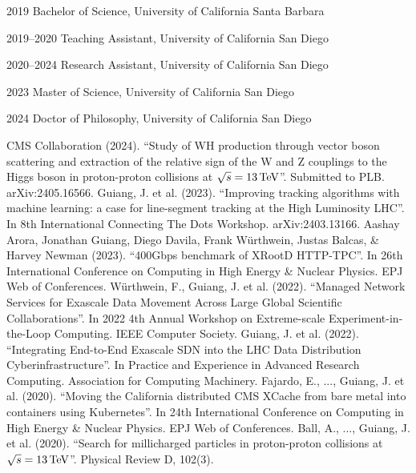 \begin{vita}
\noindent
\begin{cv}{}
\begin{cvlist}{}
\item[2019] Bachelor of Science, University of California Santa Barbara
\item[2019--2020] Teaching Assistant, University of California San Diego
\item[2020--2024] Research Assistant, University of California San Diego
\item[2023] Master of Science, University of California San Diego
\item[2024] Doctor of Philosophy, University of California San Diego
\end{cvlist}
\end{cv}

\publications
\noindent CMS Collaboration (2024). 
``Study of WH production through vector boson scattering and extraction of the relative sign of the W and Z couplings to the Higgs boson in proton-proton collisions at $\sqrt{s} = 13\,\text{Te\hspace{-.08em}V}$''. 
Submitted to PLB. arXiv:2405.16566.
\newline
\newline
\noindent Guiang, J. et al. (2023). 
``Improving tracking algorithms with machine learning: a case for line-segment tracking at the High Luminosity LHC''. 
In 8th International Connecting The Dots Workshop. arXiv:2403.13166.
\newline
\newline
\noindent Aashay Arora, Jonathan Guiang, Diego Davila, Frank W\"{u}rthwein, Justas Balcas, \& Harvey Newman (2023). 
``400Gbps benchmark of XRootD HTTP-TPC''. 
In 26th International Conference on Computing in High Energy \& Nuclear Physics. EPJ Web of Conferences.
\newline
\newline
\noindent W\"{u}rthwein, F., Guiang, J. et al. (2022). 
``Managed Network Services for Exascale Data Movement Across Large Global Scientific Collaborations''. 
In 2022 4th Annual Workshop on Extreme-scale Experiment-in-the-Loop Computing. IEEE Computer Society.
\newline
\newline
\noindent Guiang, J. et al. (2022). 
``Integrating End-to-End Exascale SDN into the LHC Data Distribution Cyberinfrastructure''. 
In Practice and Experience in Advanced Research Computing. Association for Computing Machinery.
\newline
\newline
\noindent Fajardo, E., ..., Guiang, J. et al. (2020). 
``Moving the California distributed CMS XCache from bare metal into containers using Kubernetes''. 
In 24th International Conference on Computing in High Energy \& Nuclear Physics. EPJ Web of Conferences.
\newline
\newline
\noindent Ball, A., ..., Guiang, J. et al. (2020). 
``Search for millicharged particles in proton-proton collisions at $\sqrt{s} = 13\,\text{Te\hspace{-.08em}V}$''. 
Physical Review D, 102(3).
\end{vita}
